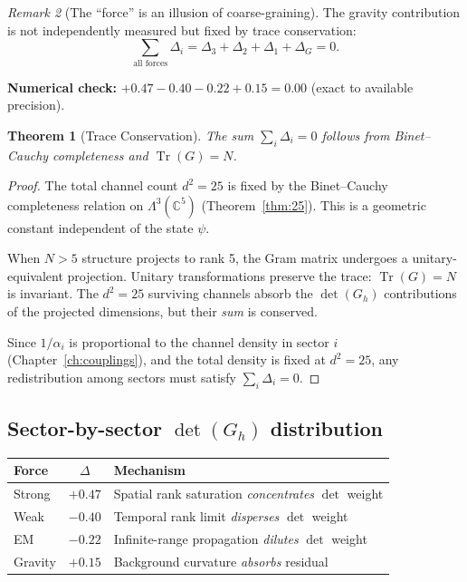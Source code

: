 \documentclass[12pt]{article}
\newtheorem{theorem}{Theorem}[section]
\theoremstyle{remark}
\newtheorem{remark}[theorem]{Remark}
\theoremstyle{definition}
\newcommand{\CC}{\mathbb{C}}
\begin{document}
\begin{remark}[The ``force'' is an illusion of coarse-graining]
The gravity contribution is not independently measured but fixed by trace conservation:
\begin{equation}
\boxed{\sum_{\text{all forces}} \Delta_i = \Delta_3 + \Delta_2 + \Delta_1 + \Delta_G = 0.}
\label{eq:ghost_sum}
\end{equation}

\textbf{Numerical check:} $+0.47 - 0.40 - 0.22 + 0.15 = 0.00$ (exact to available precision).

\begin{theorem}[Trace Conservation]
The sum $\sum_i \Delta_i = 0$ follows from Binet--Cauchy completeness and $\operatorname{Tr}(G) = N$.
\end{theorem}

\begin{proof}
The total channel count $d^2 = 25$ is fixed by the Binet--Cauchy completeness relation on $\Lambda^3(\CC^5)$ (Theorem~\ref{thm:25}). This is a geometric constant independent of the state $\psi$.

When $N > 5$ structure projects to rank 5, the Gram matrix undergoes a unitary-equivalent projection. Unitary transformations preserve the trace: $\operatorname{Tr}(G) = N$ is invariant. The $d^2 = 25$ surviving channels absorb the $\det(G_h)$ contributions of the projected dimensions, but their \emph{sum} is conserved.

Since $1/\alpha_i$ is proportional to the channel density in sector $i$ (Chapter~\ref{ch:couplings}), and the total density is fixed at $d^2 = 25$, any redistribution among sectors must satisfy $\sum_i \Delta_i = 0$.
\end{proof}

\subsection{Sector-by-sector $\det(G_h)$ distribution}

\begin{center}
\begin{tabular}{lcl}
\hline
Force & $\Delta$ & Mechanism \\
\hline
Strong & $+0.47$ & Spatial rank saturation \emph{concentrates} $\det$ weight \\
Weak & $-0.40$ & Temporal rank limit \emph{disperses} $\det$ weight \\
EM & $-0.22$ & Infinite-range propagation \emph{dilutes} $\det$ weight \\
Gravity & $+0.15$ & Background curvature \emph{absorbs} residual \\
\hline
\end{tabular}
\end{center}


\end{remark}
\end{document}
